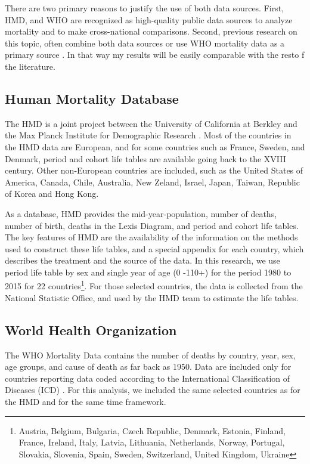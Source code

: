 \documentclass[12pt,a4paper]{article}
\begin{document}
There are two primary reasons to justify the use of both data sources. First, HMD, and WHO are recognized as high-quality public data sources to analyze mortality and to make cross-national comparisons. Second, previous research on this topic, often combine both data sources  \citep{JM2018-2, SEL16} or use WHO mortality data as a primary source \citep{Alvarez20, Cao17, Nau12}. In that way my results will be easily comparable with the resto f the literature. 

\subsection{Human Mortality Database}

The HMD is a joint project between the University of California at Berkley and the Max Planck Institute for Demographic Research \citep{HMD_Data}. Most of the countries in the HMD data are European, and for some countries such as France, Sweden, and Denmark, period and cohort life tables are available going back to the XVIII century. Other non-European countries are included, such as the United States of America, Canada, Chile, Australia, New Zeland, Israel, Japan, Taiwan, Republic of Korea and Hong Kong. 

As a database, HMD provides the mid-year-population, number of deaths, number of birth, deaths in the Lexis Diagram, and period and cohort life tables. The key features of HMD are the availability of the information on the methods used to construct these life tables, and a special appendix for each country, which describes the treatment and the source of the data. In this research, we use period life table by sex and single year of age (0 -110+)  for the period 1980 to 2015 for 22 countries\footnote{Austria, Belgium, Bulgaria, Czech Republic, Denmark, Estonia, Finland, France, Ireland, Italy, Latvia, Lithuania, Netherlands, Norway, Portugal, Slovakia, Slovenia, Spain, Sweden, Switzerland, United Kingdom, Ukraine}. For those selected countries, the data is collected from the National Statistic Office, and used by the HMD team to estimate the life tables. 

\subsection{World Health Organization}

The WHO Mortality Data contains the number of deaths by country, year, sex, age groups, and cause of death as far back as 1950. Data are included only for countries reporting data coded according to the International Classification of Diseases (ICD)  \citep{WHO_Data}. For this analysis, we included the same selected countries as for the HMD and for the same time framework. 
\end{document}
